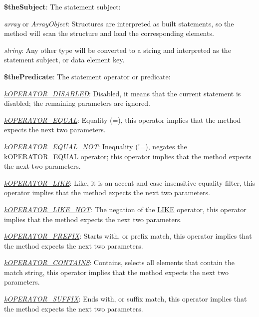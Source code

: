 \begin{DoxyItemize}
\item {\bfseries \$the\-Subject}\-: The statement subject\-: 
\begin{DoxyItemize}
\item {\itshape array} or {\itshape Array\-Object}\-: Structures are interpreted as built statements, so the method will scan the structure and load the corresponding elements. 
\item {\itshape string}\-: Any other type will be converted to a string and interpreted as the statement subject, or data element key. 
\end{DoxyItemize}
\item {\bfseries \$the\-Predicate}\-: The statement operator or predicate\-: 
\begin{DoxyItemize}
\item {\itshape \hyperlink{}{k\-O\-P\-E\-R\-A\-T\-O\-R\-\_\-\-D\-I\-S\-A\-B\-L\-E\-D}}\-: Disabled, it means that the current statement is disabled; the remaining parameters are ignored. 
\item {\itshape \hyperlink{}{k\-O\-P\-E\-R\-A\-T\-O\-R\-\_\-\-E\-Q\-U\-A\-L}}\-: Equality (=), this operator implies that the method expects the next two parameters. 
\item {\itshape \hyperlink{}{k\-O\-P\-E\-R\-A\-T\-O\-R\-\_\-\-E\-Q\-U\-A\-L\-\_\-\-N\-O\-T}}\-: Inequality (!=), negates the \hyperlink{}{k\-O\-P\-E\-R\-A\-T\-O\-R\-\_\-\-E\-Q\-U\-A\-L} operator; this operator implies that the method expects the next two parameters. 
\item {\itshape \hyperlink{}{k\-O\-P\-E\-R\-A\-T\-O\-R\-\_\-\-L\-I\-K\-E}}\-: Like, it is an accent and case insensitive equality filter, this operator implies that the method expects the next two parameters. 
\item {\itshape \hyperlink{}{k\-O\-P\-E\-R\-A\-T\-O\-R\-\_\-\-L\-I\-K\-E\-\_\-\-N\-O\-T}}\-: The negation of the \hyperlink{}{L\-I\-K\-E} operator, this operator implies that the method expects the next two parameters. 
\item {\itshape \hyperlink{}{k\-O\-P\-E\-R\-A\-T\-O\-R\-\_\-\-P\-R\-E\-F\-I\-X}}\-: Starts with, or prefix match, this operator implies that the method expects the next two parameters. 
\item {\itshape \hyperlink{}{k\-O\-P\-E\-R\-A\-T\-O\-R\-\_\-\-C\-O\-N\-T\-A\-I\-N\-S}}\-: Contains, selects all elements that contain the match string, this operator implies that the method expects the next two parameters. 
\item {\itshape \hyperlink{}{k\-O\-P\-E\-R\-A\-T\-O\-R\-\_\-\-S\-U\-F\-F\-I\-X}}\-: Ends with, or suffix match, this operator implies that the method expects the next two parameters. 

\end{DoxyItemize}
\end{DoxyItemize}
